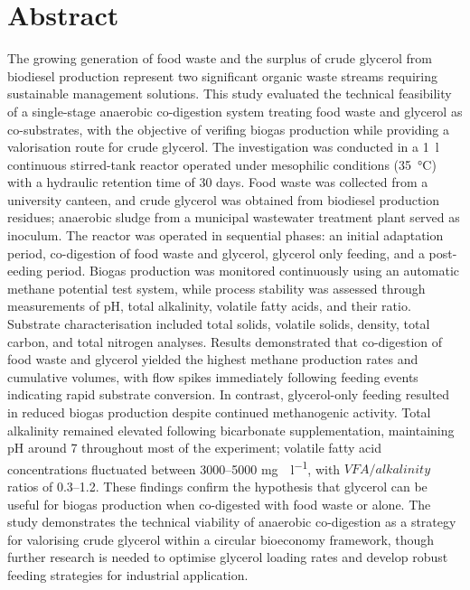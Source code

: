 \chapter*{Abstract}
\label{ch:abstract}

The growing generation of food waste and the surplus of crude glycerol from biodiesel production represent two significant organic waste streams requiring sustainable management solutions. This study evaluated the technical feasibility of a single-stage anaerobic co-digestion system treating food waste and glycerol as co-substrates, with the objective of verifing biogas production while providing a valorisation route for crude glycerol. The investigation was conducted in a \qty{1}{\litre} continuous stirred-tank reactor operated under mesophilic conditions (\qty{35}{\celsius}) with a hydraulic retention time of \num{30} days. Food waste was collected from a university canteen, and crude glycerol was obtained from biodiesel production residues; anaerobic sludge from a municipal wastewater treatment plant served as inoculum. The reactor was operated in sequential phases: an initial adaptation period, co-digestion of food waste and glycerol, glycerol only feeding, and a post-eeding period. Biogas production was monitored continuously using an automatic methane potential test system, while process stability was assessed through measurements of pH, total alkalinity, volatile fatty acids, and their ratio. Substrate characterisation included total solids, volatile solids, density, total carbon, and total nitrogen analyses. Results demonstrated that co-digestion of food waste and glycerol yielded the highest methane production rates and cumulative volumes, with flow spikes immediately following feeding events indicating rapid substrate conversion. In contrast, glycerol-only feeding resulted in reduced biogas production despite continued methanogenic activity. Total alkalinity remained elevated following bicarbonate supplementation, maintaining pH around \num{7} throughout most of the experiment; volatile fatty acid concentrations fluctuated between \numrange{3000}{5000} \unit{\milli\gram\CHCOOH\per\litre}, with $VFA/alkalinity$ ratios of \numrange{0.3}{1.2}. These findings confirm the hypothesis that glycerol can be useful for biogas production when co-digested with food waste or alone. The study demonstrates the technical viability of anaerobic co-digestion as a strategy for valorising crude glycerol within a circular bioeconomy framework, though further research is needed to optimise glycerol loading rates and develop robust feeding strategies for industrial application.
